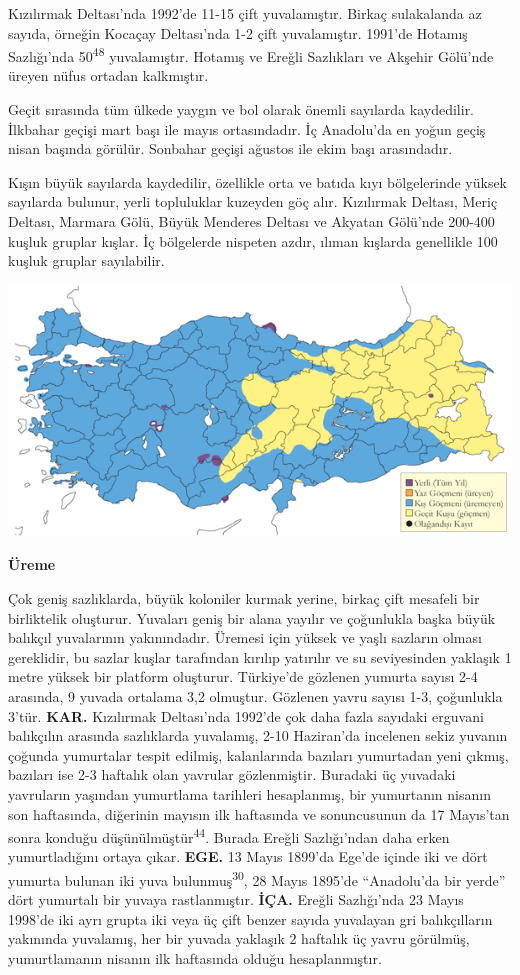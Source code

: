 \documentclass[
  letterpaper,
  DIV=11,
  numbers=noendperiod]{scrreprt}
\begin{document}
Kızılırmak Deltası'nda 1992'de 11-15 çift yuvalamıştır. Birkaç
sulakalanda az sayıda, örneğin Kocaçay Deltası'nda 1-2 çift
yuvalamıştır. 1991'de Hotamış Sazlığı'nda 50\textsuperscript{48}
yuvalamıştır. Hotamış ve Ereğli Sazlıkları ve Akşehir Gölü'nde üreyen
nüfus ortadan kalkmıştır.

Geçit sırasında tüm ülkede yaygın ve bol olarak önemli sayılarda
kaydedilir. İlkbahar geçişi mart başı ile mayıs ortasındadır. İç
Anadolu'da en yoğun geçiş nisan başında görülür. Sonbahar geçişi ağustos
ile ekim başı arasındadır.

Kışın büyük sayılarda kaydedilir, özellikle orta ve batıda kıyı
bölgelerinde yüksek sayılarda bulunur, yerli topluluklar kuzeyden göç
alır. Kızılırmak Deltası, Meriç Deltası, Marmara Gölü, Büyük Menderes
Deltası ve Akyatan Gölü'nde 200-400 kuşluk gruplar kışlar. İç bölgelerde
nispeten azdır, ılıman kışlarda genellikle 100 kuşluk gruplar
sayılabilir.

\includegraphics{images/harita_Page_071.png}

\textbf{Üreme}

Çok geniş sazlıklarda, büyük koloniler kurmak yerine, birkaç çift
mesafeli bir birliktelik oluşturur. Yuvaları geniş bir alana yayılır ve
çoğunlukla başka büyük balıkçıl yuvalarının yakınındadır. Üremesi için
yüksek ve yaşlı sazların olması gereklidir, bu sazlar kuşlar tarafından
kırılıp yatırılır ve su seviyesinden yaklaşık 1 metre yüksek bir
platform oluşturur. Türkiye'de gözlenen yumurta sayısı 2-4 arasında, 9
yuvada ortalama 3,2 olmuştur. Gözlenen yavru sayısı 1-3, çoğunlukla
3'tür. \textbf{KAR.} Kızılırmak Deltası'nda 1992'de çok daha fazla
sayıdaki erguvani balıkçılın arasında sazlıklarda yuvalamış, 2-10
Haziran'da incelenen sekiz yuvanın çoğunda yumurtalar tespit edilmiş,
kalanlarında bazıları yumurtadan yeni çıkmış, bazıları ise 2-3 haftalık
olan yavrular gözlenmiştir. Buradaki üç yuvadaki yavruların yaşından
yumurtlama tarihleri hesaplanmış, bir yumurtanın nisanın son haftasında,
diğerinin mayısın ilk haftasında ve sonuncusunun da 17 Mayıs'tan sonra
konduğu düşünülmüştür\textsuperscript{44}. Burada Ereğli Sazlığı'ndan
daha erken yumurtladığını ortaya çıkar. \textbf{EGE.} 13 Mayıs 1899'da
Ege'de içinde iki ve dört yumurta bulunan iki yuva
bulunmuş\textsuperscript{30}, 28 Mayıs 1895'de ``Anadolu'da bir yerde''
dört yumurtalı bir yuvaya rastlanmıştır. \textbf{İÇA.} Ereğli
Sazlığı'nda 23 Mayıs 1998'de iki ayrı grupta iki veya üç çift benzer
sayıda yuvalayan gri balıkçılların yakınında yuvalamış, her bir yuvada
yaklaşık 2 haftalık üç yavru görülmüş, yumurtlamanın nisanın ilk
haftasında olduğu hesaplanmıştır.
\end{document}

